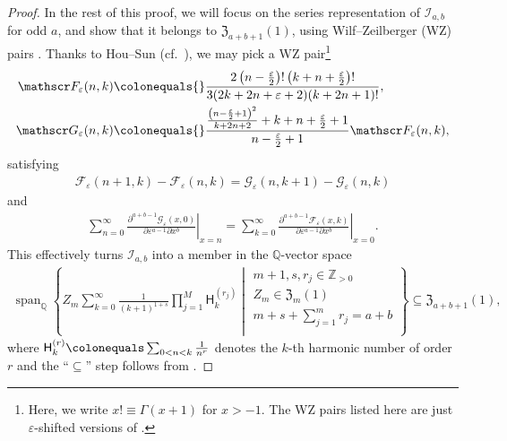 \documentclass[final,notitlepage,12pt,reqno]{amsart}
\DeclareMathOperator{\Span}{span}
\theoremstyle{plain}
\theoremstyle{definition}
\numberwithin{equation}{section}
\begin{document}
\begin{proof}
In the rest of this proof, we  will focus on the series representation of  $ \mathscr I_{a,b}$ for odd  $a$, and show that it belongs to $ \mathfrak Z_{a+b+1}(1)$, using Wilf--Zeilberger (WZ) pairs \cite{WZ1990}. Thanks to Hou--Sun  (cf.\ \cite[Theorem 1.3]{HouSun2026}), we may pick a WZ pair\footnote{Here, we write $ x!\equiv\Gamma(x+1)$ for $ x>-1$. The WZ pairs listed here are just  $ \varepsilon$-shifted versions of \cite[Theorem 1.3]{HouSun2026}. }\begin{align}
\mathscr F_{\varepsilon}(n,k)\colonequals{}&\frac{2 \left(n-\frac{\varepsilon }{2}\right)! \left(k+n+\frac{\varepsilon }{2}\right)!}{3 (2 k+2 n+\varepsilon+2) (k+2 n+1)!} ,\\\mathscr G_\varepsilon(n,k)\colonequals{}& \frac{\frac{\left(n-\frac{\varepsilon }{2}+1\right)^2}{k+2 n+2}+k+n+\frac{\varepsilon }{2}+1}{n-\frac{\varepsilon }{2}+1}\mathscr F_{\varepsilon}(n,k),
\end{align}satisfying\begin{align}
\mathscr F_{\varepsilon}(n+1,k)-\mathscr F_{\varepsilon}(n,k)=\mathscr G_\varepsilon(n,k+1)-\mathscr G_\varepsilon(n,k)
\end{align}and \begin{align}
\sum_{n=0}^\infty\left.\!\frac{\partial^{a+b-1}\mathscr G_\varepsilon(x,0)}{\partial \varepsilon^{a-1}\partial x^{b}}\right|_{x=n}=\sum_{k=0}^\infty\left.\!\frac{\partial^{a+b-1}\mathscr F_\varepsilon(x,k)}{\partial \varepsilon^{a-1}\partial x^{b}}\right|_{x=0}.
\end{align}This effectively turns $ \mathscr I_{a,b}$ into a member in the $ \mathbb Q$-vector space\begin{align}
\Span_{\mathbb Q}\left\{ Z_m\sum_{k=0}^\infty\frac{1}{(k+1)^{1+s}}\prod_{j=1}^M\mathsf H_{k}^{(r_j)}\middle|\begin{smallmatrix}m+1,s,r_j\in\mathbb Z_{>0}\\Z_m\in\mathfrak Z_m(1)\\m+s+\sum_{j=1}^m r_j=a+b\\\end{smallmatrix} \right\}\subseteq\mathfrak Z_{a+b+1}(1),
\end{align}where $ \mathsf H_{k}^{(r)}\colonequals \sum_{0<n<k}\frac{1}{n^r}$ denotes the $ k$-th harmonic number of order $r$ and the ``$ \subseteq$'' step follows from \cite[Theorem 3.1(a)]{Zhou2022mkMpl}.\end{proof}
\end{document}
